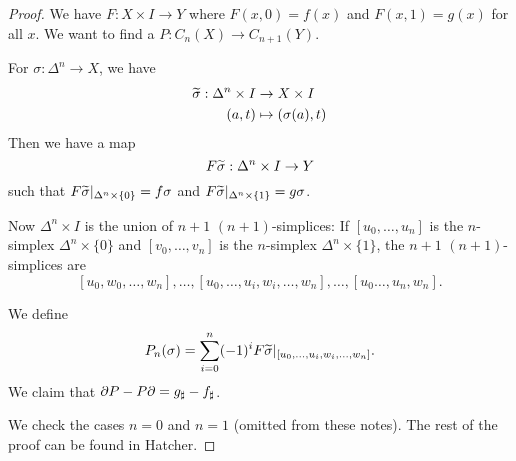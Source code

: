 \begin{proof}
  We have $F:X \times I \to Y$ where $F(x,0)=f(x)$ and $F(x,1)=g(x)$ for all $x$.
  We want to find a $P: C_n(X) \to C_{n+1}(Y)$.

  For $\sigma: \Delta^n \to X$, we have
  \begin{align*}
    \widetilde\sigma: \Delta^n \times I &\to X \times I \\
    (a,t) &\mapsto (\sigma(a),t)
  \end{align*}
  Then we have a map
  \[F\widetilde\sigma: \Delta^n \times I \to Y\]
  such that $F\widetilde\sigma|_{\Delta^n\times\{0\}}=f\sigma$ and $F\widetilde\sigma|_{\Delta^n\times\{1\}}=g\sigma$.

  Now $\Delta^n \times I$ is the union of $n+1$ $(n+1)$-simplices: If $[u_0,\ldots,u_n]$ is the $n$-simplex $\Delta^n \times \{0\}$ and $[v_0,\ldots,v_n]$ is the $n$-simplex $\Delta^n \times \{1\}$, the $n+1$ $(n+1)$-simplices are
  \[ [u_0,w_0,\ldots,w_n], \ldots, [u_0,\ldots,u_i,w_i,\ldots,w_n], \ldots, [u_0\ldots,u_n,w_n].\]

  We define
  \[P_n(\sigma) = \sum_{i=0}^n (-1)^i F\widetilde\sigma|_{[u_0,\ldots,u_i,w_i,\ldots,w_n]}.\]
  We claim that $\partial P - P \partial = g_\sharp - f_\sharp$.

  We check the cases $n=0$ and $n=1$ (omitted from these notes).
  The rest of the proof can be found in Hatcher.
\end{proof}

